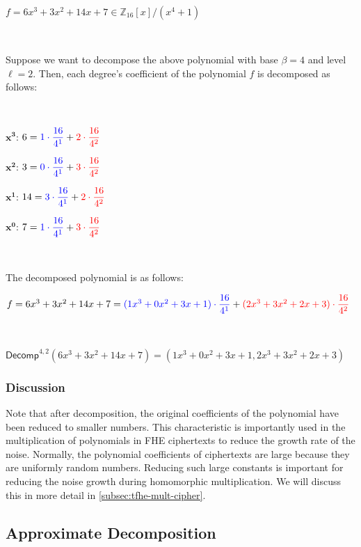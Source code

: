 $ $

$f = 6x^3 + 3x^2 + 14x + 7 \in \mathbb{Z}_{16}[x] / (x^4 + 1)$

$ $

Suppose we want to decompose the above polynomial with base $\beta = 4$ and level $\ell = 2$. Then, each degree's coefficient of the polynomial $f$ is decomposed as follows:

$ $

${\bm{x}^{\bm{3}}}$: $6 = \color{blue}{1 \cdot \dfrac{16}{4^1}} \color{black}+ \color{red}{2 \cdot \dfrac{16}{4^2}}$

${\bm{x}^{\bm{2}}}$: $3 = \color{blue}{0 \cdot \dfrac{16}{4^1}} \color{black}+ \color{red}{3 \cdot \dfrac{16}{4^2}}$

${\bm{x}^{\bm{1}}}$: $14 = \color{blue}{3 \cdot \dfrac{16}{4^1}} \color{black}+ \color{red}{2 \cdot \dfrac{16}{4^2}}$

${\bm{x}^{\bm{0}}}$: $7 = \color{blue}{1 \cdot \dfrac{16}{4^1}} \color{black}+ \color{red}{3 \cdot \dfrac{16}{4^2}}$

$ $

The decomposed polynomial is as follows:

$f = 6x^3 + 3x^2 + 14x + 7 = \color{blue}{(1x^3 + 0x^2 + 3x + 1) \cdot \dfrac{16}{4^1}} \color{black}+ \color{red}{(2x^3 + 3x^2 + 2x + 3) \cdot \dfrac{16}{4^2}} \color{black}$

$ $

$\textsf{Decomp}^{4, 2}(6x^3 + 3x^2 + 14x + 7) = (1x^3 + 0x^2 + 3x + 1, 2x^3 + 3x^2 + 2x + 3)$

\subsubsection{Discussion}

Note that after decomposition, the original coefficients of the polynomial have been reduced to smaller numbers. This characteristic is importantly used in the multiplication of polynomials in FHE ciphertexts to reduce the growth rate of the noise. Normally, the polynomial coefficients of ciphertexts are large because they are uniformly random numbers. Reducing such large constants is important for reducing the noise growth during homomorphic multiplication. We will discuss this in more detail in \autoref{subsec:tfhe-mult-cipher}.


\subsection{Approximate Decomposition}
\label{subsec:approx-decomp}

